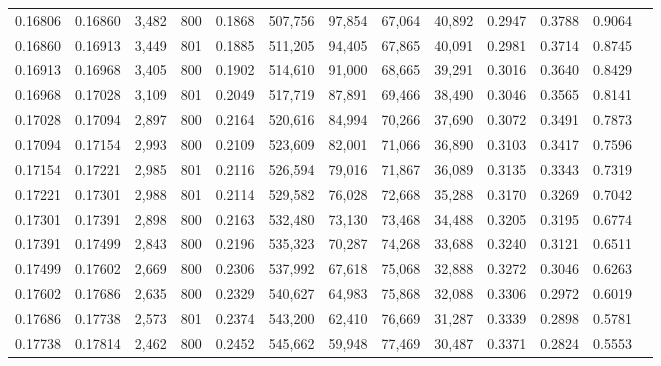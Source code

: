 \begin{tabular}{rrrrrrrrrrrrr}
0.16806 & 0.16860 &  3,482 & 800 &                                     0.1868 & 507,756 &  97,854 &  67,064 &  40,892 & 0.2947 & 0.3788 & 0.9064 \\
0.16860 & 0.16913 &  3,449 & 801 &                                     0.1885 & 511,205 &  94,405 &  67,865 &  40,091 & 0.2981 & 0.3714 & 0.8745 \\
0.16913 & 0.16968 &  3,405 & 800 &                                     0.1902 & 514,610 &  91,000 &  68,665 &  39,291 & 0.3016 & 0.3640 & 0.8429 \\
0.16968 & 0.17028 &  3,109 & 801 &                                     0.2049 & 517,719 &  87,891 &  69,466 &  38,490 & 0.3046 & 0.3565 & 0.8141 \\
0.17028 & 0.17094 &  2,897 & 800 &                                     0.2164 & 520,616 &  84,994 &  70,266 &  37,690 & 0.3072 & 0.3491 & 0.7873 \\
0.17094 & 0.17154 &  2,993 & 800 &                                     0.2109 & 523,609 &  82,001 &  71,066 &  36,890 & 0.3103 & 0.3417 & 0.7596 \\
0.17154 & 0.17221 &  2,985 & 801 &                                     0.2116 & 526,594 &  79,016 &  71,867 &  36,089 & 0.3135 & 0.3343 & 0.7319 \\
0.17221 & 0.17301 &  2,988 & 801 &                                     0.2114 & 529,582 &  76,028 &  72,668 &  35,288 & 0.3170 & 0.3269 & 0.7042 \\
0.17301 & 0.17391 &  2,898 & 800 &                                     0.2163 & 532,480 &  73,130 &  73,468 &  34,488 & 0.3205 & 0.3195 & 0.6774 \\
0.17391 & 0.17499 &  2,843 & 800 &                                     0.2196 & 535,323 &  70,287 &  74,268 &  33,688 & 0.3240 & 0.3121 & 0.6511 \\
0.17499 & 0.17602 &  2,669 & 800 &                                     0.2306 & 537,992 &  67,618 &  75,068 &  32,888 & 0.3272 & 0.3046 & 0.6263 \\
0.17602 & 0.17686 &  2,635 & 800 &                                     0.2329 & 540,627 &  64,983 &  75,868 &  32,088 & 0.3306 & 0.2972 & 0.6019 \\
0.17686 & 0.17738 &  2,573 & 801 &                                     0.2374 & 543,200 &  62,410 &  76,669 &  31,287 & 0.3339 & 0.2898 & 0.5781 \\
0.17738 & 0.17814 &  2,462 & 800 &                                     0.2452 & 545,662 &  59,948 &  77,469 &  30,487 & 0.3371 & 0.2824 & 0.5553 \\

\end{tabular}
